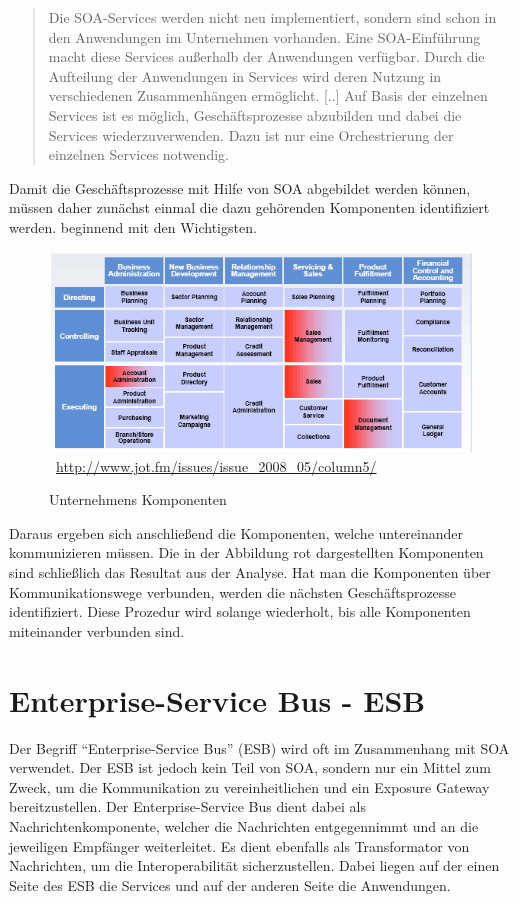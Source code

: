 \begin{quotation}
	\frqq Die SOA-Services werden nicht neu implementiert, sondern sind schon in den Anwendungen im Unternehmen vorhanden. Eine SOA-Einführung macht diese Services außerhalb der Anwendungen verfügbar. Durch die Aufteilung der Anwendungen in Services wird deren Nutzung in verschiedenen Zusammenhängen ermöglicht. [..] Auf Basis der einzelnen Services ist es möglich, Geschäftsprozesse abzubilden und dabei die Services wiederzuverwenden. Dazu ist nur eine Orchestrierung der einzelnen Services notwendig.\flqq\ \cite[S. 84]{EWolff2016:Microservices}
\end{quotation}

Damit die Geschäftsprozesse mit Hilfe von SOA abgebildet werden können, müssen daher zunächst einmal die dazu gehörenden Komponenten identifiziert werden. beginnend mit den Wichtigsten.

\begin{figure}[htb]
    \centering 
    \includegraphics[width=\linewidth]{content/images/UnternehmensKomponenten}\
    \quelle\url{http://www.jot.fm/issues/issue_2008_05/column5/}
    \caption[Unternehmens Komponenten]{Unternehmens Komponenten\\}
    \label{fig:UnternehmensKomponenten}  
\end{figure} 
\newpage
Daraus ergeben sich anschließend die Komponenten, welche untereinander kommunizieren müssen. Die in der Abbildung rot dargestellten Komponenten sind schließlich das Resultat aus der Analyse. Hat man die Komponenten über Kommunikationswege verbunden, werden die nächsten Geschäftsprozesse identifiziert. Diese Prozedur wird solange wiederholt, bis alle Komponenten miteinander verbunden sind.

\section{Enterprise-Service Bus - ESB}
\label{sec:esb}
Der Begriff "`Enterprise-Service Bus"' (ESB) wird oft im Zusammenhang mit SOA verwendet. Der ESB ist jedoch kein Teil von SOA, sondern nur ein Mittel zum Zweck, um die Kommunikation zu vereinheitlichen und ein Exposure Gateway bereitzustellen. Der Enterprise-Service Bus dient dabei als Nachrichtenkomponente, welcher die Nachrichten entgegennimmt und an die jeweiligen Empfänger weiterleitet. Es dient ebenfalls als Transformator von Nachrichten, um die Interoperabilität sicherzustellen. Dabei liegen auf der einen Seite des ESB die Services und auf der anderen Seite die Anwendungen.


